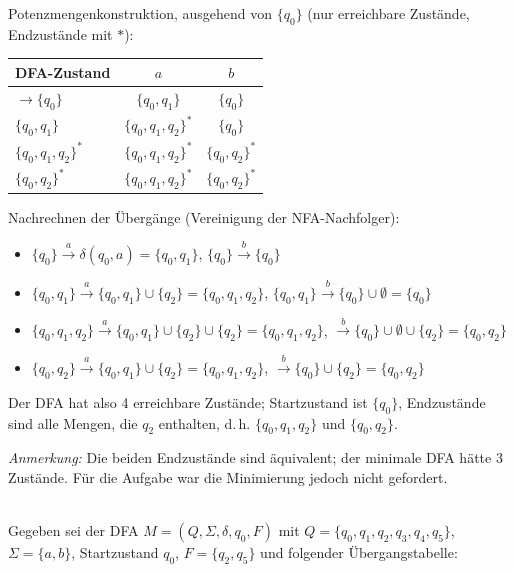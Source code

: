 \begin{loesung}
Potenzmengenkonstruktion, ausgehend von $\{q_0\}$ (nur erreichbare Zustände, Endzustände mit $*$):

\begin{center}
\begin{tabular}{l|cc}
  DFA-Zustand & $a$ & $b$ \\
  \hline
  $\to\{q_0\}$ & $\{q_0,q_1\}$ & $\{q_0\}$ \\
  $\{q_0,q_1\}$ & $\{q_0,q_1,q_2\}^*$ & $\{q_0\}$ \\
  $\{q_0,q_1,q_2\}^*$ & $\{q_0,q_1,q_2\}^*$ & $\{q_0,q_2\}^*$ \\
  $\{q_0,q_2\}^*$ & $\{q_0,q_1,q_2\}^*$ & $\{q_0,q_2\}^*$ \\
\end{tabular}
\end{center}

Nachrechnen der Übergänge (Vereinigung der NFA-Nachfolger):
\begin{itemize}
  \item $\{q_0\}\xrightarrow{a}\delta(q_0,a)=\{q_0,q_1\}$, \quad $\{q_0\}\xrightarrow{b}\{q_0\}$
  \item $\{q_0,q_1\}\xrightarrow{a}\{q_0,q_1\}\cup\{q_2\}=\{q_0,q_1,q_2\}$, \quad $\{q_0,q_1\}\xrightarrow{b}\{q_0\}\cup\emptyset=\{q_0\}$
  \item $\{q_0,q_1,q_2\}\xrightarrow{a}\{q_0,q_1\}\cup\{q_2\}\cup\{q_2\}=\{q_0,q_1,q_2\}$, \quad $\xrightarrow{b}\{q_0\}\cup\emptyset\cup\{q_2\}=\{q_0,q_2\}$
  \item $\{q_0,q_2\}\xrightarrow{a}\{q_0,q_1\}\cup\{q_2\}=\{q_0,q_1,q_2\}$, \quad $\xrightarrow{b}\{q_0\}\cup\{q_2\}=\{q_0,q_2\}$
\end{itemize}

Der DFA hat also 4 erreichbare Zustände; Startzustand ist $\{q_0\}$, Endzustände sind alle Mengen, die $q_2$ enthalten, d.\,h. $\{q_0,q_1,q_2\}$ und $\{q_0,q_2\}$.

\textit{Anmerkung:} Die beiden Endzustände sind äquivalent; der minimale DFA hätte 3 Zustände. Für die Aufgabe war die Minimierung jedoch nicht gefordert.
\end{loesung}

\\
Gegeben sei der DFA $M = (Q, \Sigma, \delta, q_0, F)$ mit $Q = \{q_0, q_1, q_2, q_3, q_4, q_5\}$, $\Sigma = \{a,b\}$, Startzustand $q_0$, $F = \{q_2, q_5\}$ und folgender Übergangstabelle:

